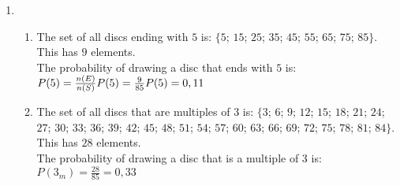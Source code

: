 \begin{solutions}{}
{\begin{enumerate}[itemsep=5pt, label=\textbf{\arabic*}. ]
\begin{enumerate}[noitemsep, label=\textbf{(\alph*)} ]
    \item The probability of a randomly selected child being a 4 year old male is:\\
    $P(\mbox{male}) = \frac{7}{30}\\
	      = 0,23$

    \item There are $6 + 2 + 5 + 7 = 20$ children aged 3 or 4.\\
    The probability of a randomly selected child being either 3 or 4 is:\\
    $\frac{20}{30} = 0,67$

    \item A child cannot be both 3 and 4, so the probability is $0$.

    \item This is the same as a randomly selected child being either 3 or 4 and so is $0,67$.

    \item The probability of a child being either 3 or female is:\\
    $P(3 \cup \mbox{female}) = P(3) + P(\mbox{female}) - P(3 \cap \mbox{female})\\
		      = \frac{10}{30} + 0,5 - \frac{10}{30} \times \frac{15}{30}\\
		      = 0,67$
    \end{enumerate}
    
\item %
    \begin{enumerate}[noitemsep, label=\textbf{(\alph*)} ]
    \item The set of all discs ending with $5$ is: $\{5$; $15$; $25$; $35$; $45$; $55$; $65$; $75$; $85\}$. This has $9$ elements.\\
 
    The probability of drawing a disc that ends with $5$ is:\\
    $P(5) = \frac{n(E)}{n(S)}\\
     P(5) = \frac{9}{85}\\
     P(5) = 0,11$

    \item The set of all discs that are multiples of $3$ is: $\{3$; $6$; $ 9$; $ 12$; $ 15$; $ 18$; $ 21$; $ 24$; $ 27$; $ 30$; $ 33$; $ 36$; $ 39$; $ 42$; $ 45$; $ 48$; $ 51$; $ 54$; $ 57$; $ 60$; $ 63$; $ 66$; $ 69$; $ 72$; $ 75$; $ 78$; $ 81$; $ 84\}$. This has $28$ elements.\\
    \newline
    The probability of drawing a disc that is a multiple of $3$ is:
    $P(3_m) = \frac{28}{85}
	    = 0,33$


\end{enumerate}
\end{enumerate}}
\end{solutions}
